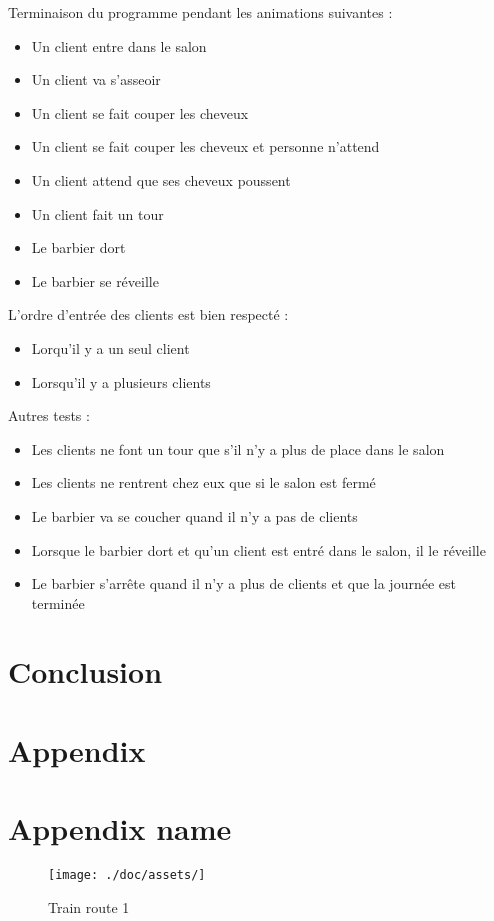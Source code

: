 \documentclass{article}
\begin{document}
    Terminaison du programme pendant les animations suivantes :
    \begin{itemize}
        \item Un client entre dans le salon
        \item Un client va s'asseoir
        \item Un client se fait couper les cheveux
        \item Un client se fait couper les cheveux et personne n'attend
        \item Un client attend que ses cheveux poussent
        \item Un client fait un tour
        \item Le barbier dort
        \item Le barbier se réveille
    \end{itemize}

    L'ordre d'entrée des clients est bien respecté :
    \begin{itemize}
        \item Lorqu'il y a un seul client
        \item Lorsqu'il y a plusieurs clients
    \end{itemize}

    Autres tests :
    \begin{itemize}
        \item Les clients ne font un tour que s'il n'y a plus de place dans le salon
        \item Les clients ne rentrent chez eux que si le salon est fermé
        \item Le barbier va se coucher quand il n'y a pas de clients
        \item Lorsque le barbier dort et qu'un client est entré dans le salon, il le réveille
        \item Le barbier s'arrête quand il n'y a plus de clients et que la journée est terminée
    \end{itemize}

    \section{Conclusion}

    \section*{Appendix}

    \section{Appendix name}
    \begin{figure}[!htb]
        \centering
        \texttt{[image: ./doc/assets/]}
        \caption{Train route 1}
    \end{figure}
\end{document}

